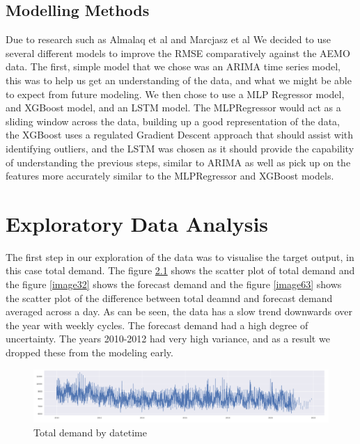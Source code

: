 \documentclass[mstat,12pt]{unswthesis}
\begin{document}
\hypertarget{modelling-methods}{%
\section{Modelling Methods}\label{modelling-methods}}

Due to research such as Almalaq et al \cite{almalaq_2017_a} and Marcjasz
et al \cite{marcjasz_2008_neural} We decided to use several different
models to improve the RMSE comparatively against the AEMO data. The
first, simple model that we chose was an ARIMA time series model, this
was to help us get an understanding of the data, and what we might be
able to expect from future modeling. We then chose to use a MLP
Regressor model, and XGBoost model, and an LSTM model. The MLPRegressor
would act as a sliding window across the data, building up a good
representation of the data, the XGBoost uses a regulated Gradient
Descent approach that should assist with identifying outliers, and the
LSTM was chosen as it should provide the capability of understanding the
previous steps, similar to ARIMA as well as pick up on the features more
accurately similar to the MLPRegressor and XGBoost models.

\hypertarget{exploratory-data-analysis}{%
\chapter{Exploratory Data Analysis}\label{exploratory-data-analysis}}

The first step in our exploration of the data was to visualise the
target output, in this case total demand. The figure \ref{image12} shows
the scatter plot of total demand and the figure \ref{image32} shows the
forecast demand and the figure \ref{image63} shows the scatter plot of
the difference between total deamnd and forecast demand averaged across
a day. As can be seen, the data has a slow trend downwards over the year
with weekly cycles. The forecast demand had a high degree of
uncertainty. The years 2010-2012 had very high variance, and as a result
we dropped these from the modeling early.

\begin{figure}[H]
\includegraphics[width=140mm]{image12.png}
\caption{Total demand by datetime}
\label{image12}
\end{figure}
\end{document}
